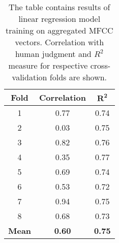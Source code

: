\begin{table}
\begin{center}
\begin{tabular}{ |c|c|c| } 
 \hline
 \textbf{Fold} & \textbf{Correlation} & $\boldsymbol{R^2}$ \\ \hline
 1 & 0.77 & 0.74 \\ \hline
 2 & 0.03 & 0.75 \\ \hline
 3 & 0.82 & 0.76 \\ \hline
 4 & 0.35 & 0.77 \\ \hline
 5 & 0.69 & 0.74 \\ \hline
 6 & 0.53 & 0.72 \\ \hline
 7 & 0.94 & 0.75 \\ \hline
 8 & 0.68 & 0.73 \\ \hline
 \textbf{Mean} & \textbf{0.60} & \textbf{0.75} \\ \hline
 
 \end{tabular}
\end{center}
\label{cv}
\caption{The table contains results of linear regression model training on aggregated MFCC vectors. Correlation with human judgment and $R^2$ measure for respective cross-validation folds are shown.}
\end{table}
